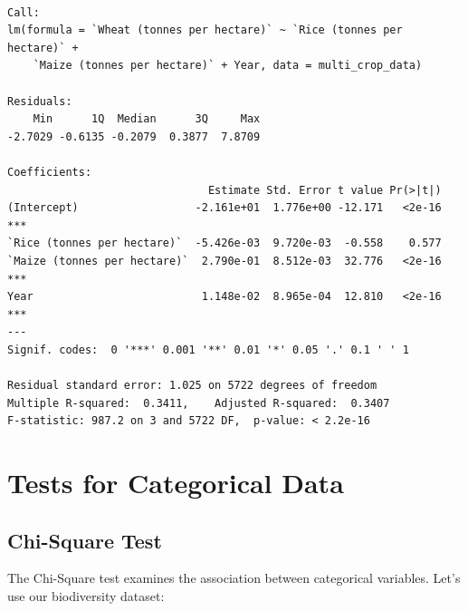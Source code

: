 \documentclass[
  letterpaper,
]{book}
\begin{document}
\begin{verbatim}

Call:
lm(formula = `Wheat (tonnes per hectare)` ~ `Rice (tonnes per hectare)` + 
    `Maize (tonnes per hectare)` + Year, data = multi_crop_data)

Residuals:
    Min      1Q  Median      3Q     Max 
-2.7029 -0.6135 -0.2079  0.3877  7.8709 

Coefficients:
                               Estimate Std. Error t value Pr(>|t|)    
(Intercept)                  -2.161e+01  1.776e+00 -12.171   <2e-16 ***
`Rice (tonnes per hectare)`  -5.426e-03  9.720e-03  -0.558    0.577    
`Maize (tonnes per hectare)`  2.790e-01  8.512e-03  32.776   <2e-16 ***
Year                          1.148e-02  8.965e-04  12.810   <2e-16 ***
---
Signif. codes:  0 '***' 0.001 '**' 0.01 '*' 0.05 '.' 0.1 ' ' 1

Residual standard error: 1.025 on 5722 degrees of freedom
Multiple R-squared:  0.3411,    Adjusted R-squared:  0.3407 
F-statistic: 987.2 on 3 and 5722 DF,  p-value: < 2.2e-16
\end{verbatim}

\section{Tests for Categorical Data}\label{tests-for-categorical-data}

\subsection{Chi-Square Test}\label{chi-square-test}

The Chi-Square test examines the association between categorical
variables. Let's use our biodiversity dataset:
\end{document}

